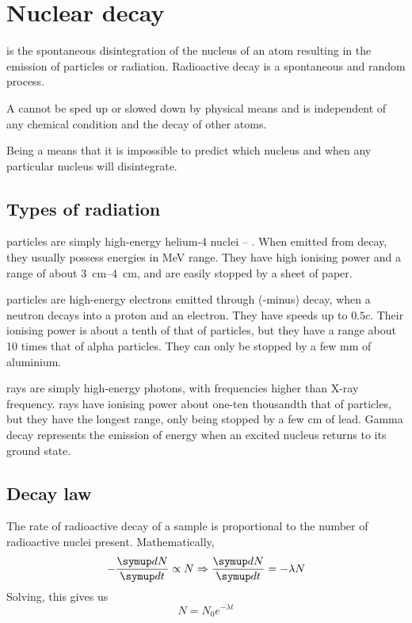 \documentclass[Physics.tex]{subfiles}
\begin{document}
\section{Nuclear decay}
 is the spontaneous disintegration of the nucleus of an atom resulting in the emission of particles or radiation. Radioactive decay is a spontaneous and random process.

A  cannot be sped up or slowed down by physical means and is independent of any chemical condition and the decay of other atoms.

Being a  means that it is impossible to predict which nucleus and when any particular nucleus will disintegrate.
\subsection{Types of radiation}
\upalpha{} particles are simply high-energy helium-4 nuclei -- . When emitted from \upalpha{} decay, they usually possess energies in \si{\mega\electronvolt} range. They have high ionising power and a range of about \SIrange{3}{4}{\centi\metre}, and are easily stopped by a sheet of paper.

\upbeta{} particles are high-energy electrons emitted through \upbeta{}(-minus) decay, when a neutron decays into a proton and an electron. They have speeds up to \(0.5c\). Their ionising power is about a tenth of that of \upalpha{} particles, but they have a range about \num{10} times that of alpha particles. They can only be stopped by a few \si{\milli\metre} of aluminium.

\upgamma{} rays are simply high-energy photons, with frequencies higher than X-ray frequency. \upgamma{} rays have ionising power about one-ten thousandth that of \upalpha{} particles, but they have the longest range, only being stopped by a few \si{\centi\metre} of lead. Gamma decay represents the emission of energy when an excited nucleus returns to its ground state.
\subsection{Decay law}
The rate of radioactive decay of a sample is proportional to the number of radioactive nuclei present. Mathematically, \[-\sldd{N}{t} \propto N \Rightarrow \sldd{N}{t} = -\lambda N\] Solving, this gives us \begin{equation}N = N_0e^{-\lambda t}\label{eq:20.nd.n}\end{equation}
\end{document}
